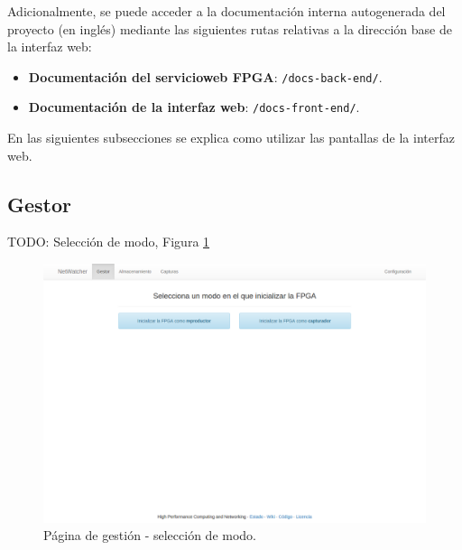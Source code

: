 Adicionalmente, se puede acceder a la documentación interna autogenerada del proyecto (en inglés) mediante las siguientes rutas relativas a la dirección base de la interfaz web:
\begin{itemize}
  \item \textbf{Documentación del \gls{servicioweb} \gls{FPGA}}: \texttt{/docs-back-end/}.
  \item \textbf{Documentación de la interfaz web}: \texttt{/docs-front-end/}.
\end{itemize}

En las siguientes subsecciones se explica como utilizar las pantallas de la interfaz web.


\subsection{Gestor\label{extra:manual:gestor}}

TODO: Selección de modo, Figura \ref{fig:captura:gestionseleccion}
\begin{figure}[H]
  \centering
  \includegraphics[width=\textwidth,clip=true]{graphics/capturas/gestor_seleccion}
  \caption{Página de gestión - selección de modo.}
  \label{fig:captura:gestionseleccion}
\end{figure}

